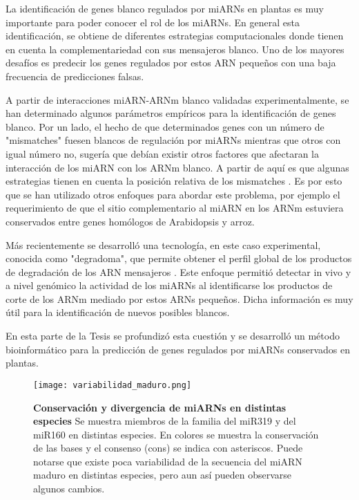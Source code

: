 La identificación de genes blanco regulados por miARNs en plantas es muy importante para poder conocer el rol de los miARNs.
En general esta identificación, se obtiene de diferentes estrategias computacionales donde tienen en cuenta la complementariedad con sus mensajeros blanco.
Uno de los mayores desafíos es predecir los genes regulados por estos ARN pequeños con una baja frecuencia de predicciones falsas.

A partir de interacciones miARN-ARNm blanco validadas experimentalmente, se han determinado algunos parámetros empíricos para la identificación de genes blanco.
Por un lado, el hecho de que determinados genes con un número de "mismatches" fuesen blancos de regulación por miARNs mientras que otros con igual número no, sugería que debían existir otros factores que afectaran la interacción de los miARN con los ARNm blanco.
A partir de aquí es que algunas estrategias tienen en cuenta la posición relativa de los mismatches \citep{Schwab2005517}.
Es por esto que se han utilizado otros enfoques para abordar este problema, por ejemplo el requerimiento de que el sitio complementario al miARN en los ARNm estuviera conservados entre genes homólogos de Arabidopsis y arroz.

Más recientemente se desarrolló una tecnología, en este caso experimental, conocida como "degradoma", que permite obtener el perfil global de los productos de degradación de los ARN mensajeros \citep{German2008,pmid18472421}.
Este enfoque permitió detectar in vivo y a nivel genómico la actividad de los miARNs al identificarse los productos de corte de los ARNm mediado por estos ARNs pequeños.
Dicha información es muy útil para la identificación de nuevos posibles blancos.

En esta parte de la Tesis se profundizó esta cuestión y se desarrolló un método bioinformático para la predicción de genes regulados por miARNs conservados en plantas.

\begin{figure}[htbp!] 
    \centering    
    \texttt{[image: variabilidad\_maduro.png]}
    \caption[Conservación y divergencia de miARNs en distintas especies]{
    \textbf{Conservación y divergencia de miARNs en distintas especies}
    Se muestra miembros de la familia del miR319 y del miR160 en distintas especies. 
    En colores se muestra la conservación de las bases  y el consenso (cons) se indica con asteriscos.
    Puede notarse que existe poca variabilidad de la secuencia del miARN maduro en distintas especies, pero aun así pueden observarse algunos cambios. 
		}
    \label{fig:variabilidad_maduro}
\end{figure}


